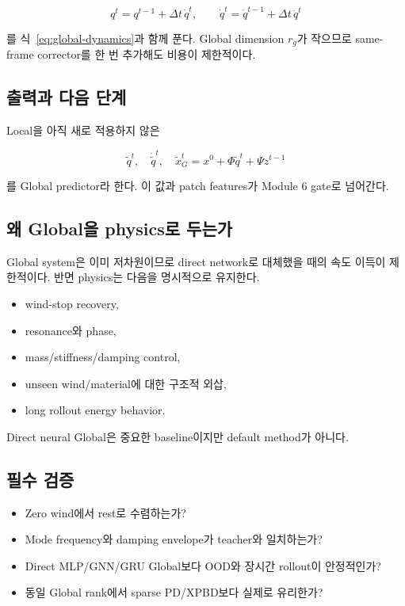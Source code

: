 \documentclass[11pt,a4paper]{article}
\begin{document}
\begin{equation}
  q^t=q^{t-1}+\Delta t\,\dot q^t,
  \qquad
  \dot q^t=\dot q^{t-1}+\Delta t\,\ddot q^t
\end{equation}

를 식~\eqref{eq:global-dynamics}과 함께 푼다.
Global dimension \(r_g\)가 작으므로 same-frame corrector를 한 번 추가해도 비용이 제한적이다.

\subsection*{출력과 다음 단계}

Local을 아직 새로 적용하지 않은

\begin{equation}
  \widetilde q^t,\quad
  \dot{\widetilde q}^t,\quad
  \widetilde x_G^t=x^0+\Phi\widetilde q^t+\Psi z^{t-1}
\end{equation}

를 Global predictor라 한다.
이 값과 patch features가 Module 6 gate로 넘어간다.

\subsection*{왜 Global을 physics로 두는가}

Global system은 이미 저차원이므로 direct network로 대체했을 때의 속도 이득이 제한적이다.
반면 physics는 다음을 명시적으로 유지한다.

\begin{itemize}[leftmargin=1.5em]
  \item wind-stop recovery,
  \item resonance와 phase,
  \item mass/stiffness/damping control,
  \item unseen wind/material에 대한 구조적 외삽,
  \item long rollout energy behavior.
\end{itemize}

Direct neural Global은 중요한 baseline이지만 default method가 아니다.

\subsection*{필수 검증}

\begin{itemize}[leftmargin=1.5em]
  \item Zero wind에서 rest로 수렴하는가?
  \item Mode frequency와 damping envelope가 teacher와 일치하는가?
  \item Direct MLP/GNN/GRU Global보다 OOD와 장시간 rollout이 안정적인가?
  \item 동일 Global rank에서 sparse PD/XPBD보다 실제로 유리한가?
\end{itemize}
\end{document}
